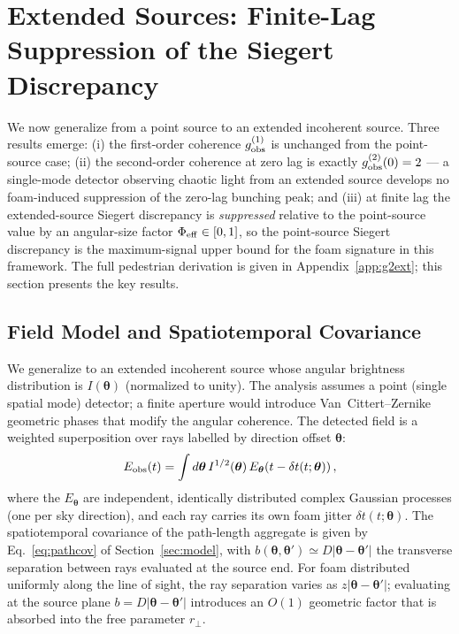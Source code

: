 \documentclass[aps,prd,onecolumn,amsmath,amssymb]{revtex4-2}
\begin{document}
\section{Extended Sources: Finite-Lag Suppression of the Siegert Discrepancy}
\label{sec:extended}

We now generalize from a point source to an extended incoherent source.
Three results emerge: (i) the first-order coherence $g^{(1)}_{\rm obs}$ is
unchanged from the point-source case; (ii) the second-order coherence at
zero lag is exactly $g^{(2)}_{\rm obs}(0) = 2$ --- a single-mode detector
observing chaotic light from an extended source develops no foam-induced
suppression of the zero-lag bunching peak; and (iii) at finite lag the
extended-source Siegert discrepancy is \emph{suppressed} relative to the
point-source value by an angular-size factor $\Phi_{\rm eff} \in [0,1]$,
so the point-source Siegert discrepancy is the maximum-signal upper bound
for the foam signature in this framework.  The full pedestrian derivation is
given in Appendix~\ref{app:g2ext}; this section presents the key results.

\subsection{Field Model and Spatiotemporal Covariance}

We generalize to an extended incoherent source whose angular brightness
distribution is $I(\boldsymbol{\theta})$ (normalized to unity).
The analysis assumes a point (single spatial mode) detector; a finite aperture
would introduce Van~Cittert--Zernike geometric phases that modify the angular
coherence.
The detected field is a weighted superposition over rays labelled by direction
offset $\boldsymbol{\theta}$:
\begin{equation}
  E_{\rm obs}(t) = \int d\boldsymbol{\theta}\,I^{1/2}(\boldsymbol{\theta})\,
  E_{\boldsymbol{\theta}}\!\left(t - \delta t(t;\boldsymbol{\theta})\right),
  \label{eq:EobsExt}
\end{equation}
where the $E_{\boldsymbol{\theta}}$ are independent, identically distributed
complex Gaussian processes (one per sky direction), and each ray carries its
own foam jitter $\delta t(t;\boldsymbol{\theta})$.
The spatiotemporal covariance of the path-length aggregate is given by
Eq.~\eqref{eq:pathcov} of Section~\ref{sec:model}, with
$b(\boldsymbol{\theta},\boldsymbol{\theta}') \simeq D|\boldsymbol{\theta}-\boldsymbol{\theta}'|$
the transverse separation between rays evaluated at the source end.
For foam distributed uniformly along the line of sight, the ray separation varies as $z|\boldsymbol{\theta}-\boldsymbol{\theta}'|$; evaluating at the source plane $b = D|\boldsymbol{\theta}-\boldsymbol{\theta}'|$ introduces an $O(1)$ geometric factor that is absorbed into the free parameter $r_\perp$.
\end{document}
